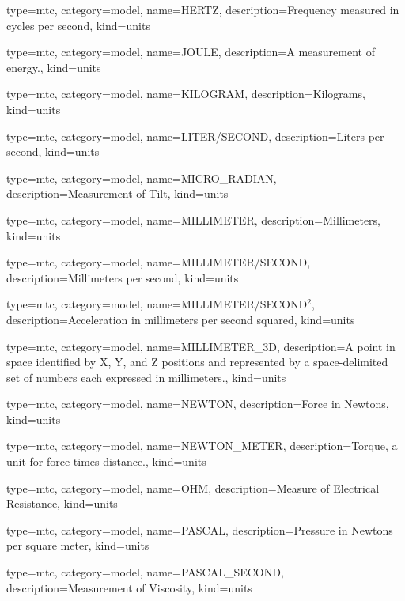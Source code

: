 {
  type=mtc,
  category=model,
  name={HERTZ},
  description={Frequency measured in cycles per second},
  kind={units}
}


{
  type=mtc,
  category=model,
  name={JOULE},
  description={A measurement of energy.},
  kind={units}
}


{
  type=mtc,
  category=model,
  name={KILOGRAM},
  description={Kilograms},
  kind={units}
}



{
  type=mtc,
  category=model,
  name={LITER/SECOND},
  description={Liters per second},
  kind={units}
}


{
  type=mtc,
  category=model,
  name={MICRO\_RADIAN},
  description={Measurement of Tilt},
  kind={units}
}


{
  type=mtc,
  category=model,
  name={MILLIMETER},
  description={Millimeters},
  kind={units}
}


{
  type=mtc,
  category=model,
  name={MILLIMETER/SECOND},
  description={Millimeters per second},
  kind={units}
}


{
  type=mtc,
  category=model,
  name={MILLIMETER/SECOND$^2$},
  description={Acceleration in millimeters per second squared},
  kind={units}
}


{
  type=mtc,
  category=model,
  name={MILLIMETER\_3D},
  description={A point in space identified by X, Y, and Z positions and represented by a space-delimited set of numbers each expressed in millimeters.},
  kind={units}
}


{
  type=mtc,
  category=model,
  name={NEWTON},
  description={Force in Newtons},
  kind={units}
}


{
  type=mtc,
  category=model,
  name={NEWTON\_METER},
  description={Torque, a unit for force times distance.},
  kind={units}
}


{
  type=mtc,
  category=model,
  name={OHM},
  description={Measure of Electrical Resistance},
  kind={units}
}


{
  type=mtc,
  category=model,
  name={PASCAL},
  description={Pressure in Newtons per square meter},
  kind={units}
}


{
  type=mtc,
  category=model,
  name={PASCAL\_SECOND},
  description={Measurement of Viscosity},
  kind={units}
}


